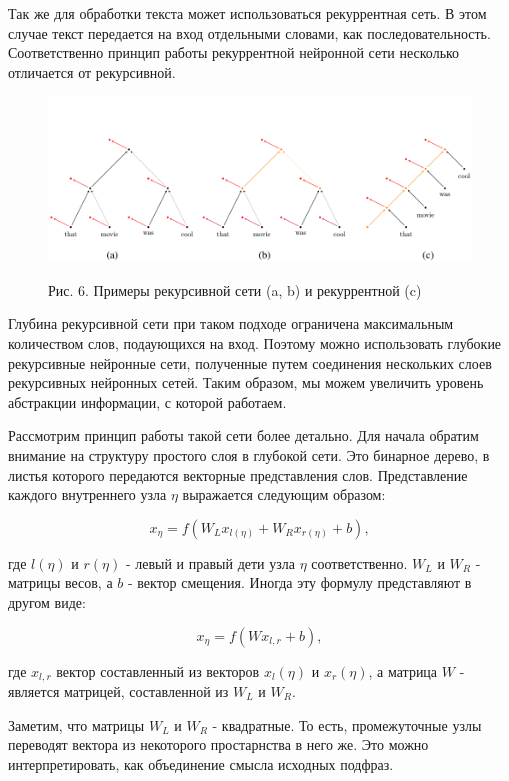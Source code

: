 \documentclass[14pt]{article}
\begin{document}
Так же для обработки текста может использоваться рекуррентная сеть. В этом случае текст передается на вход отдельными словами, как последовательность. Соответственно принцип работы рекуррентной нейронной сети несколько отличается от рекурсивной.
\pagebreak
\begin{figure}[!h]
    \centering
        \includegraphics[width=16cm]{Fig6.png}
    \parbox[t][1.2cm][c]{16cm}{
        \centering
        Рис. 6. Примеры рекурсивной сети (a, b) и рекуррентной (c)
    }
\end{figure}


Глубина рекурсивной сети при таком подходе ограничена максимальным количеством слов, подаующихся на вход. Поэтому можно использовать глубокие рекурсивные нейронные сети, полученные путем соединения нескольких слоев рекурсивных нейронных сетей. Таким образом, мы можем увеличить уровень абстракции информации, с которой работаем.


Рассмотрим принцип работы такой сети более детально. Для начала обратим внимание на структуру простого слоя в глубокой сети. Это бинарное дерево, в листья которого передаются векторные представления слов. Представление каждого внутреннего узла $\eta$ выражается следующим образом:


\begin{equation}
x_\eta=f(W_Lx_{l(\eta)} + W_Rx_{r(\eta)} + b),
\end{equation}


где $l(\eta)$ и $r(\eta)$ - левый и правый дети узла $\eta$ соответственно. $W_L$ и $W_R$ - матрицы весов, а $b$ - вектор смещения. Иногда эту формулу представляют в другом виде:


\begin{equation}
x_\eta=f(Wx_{l, r} + b),
\end{equation}

где $x_{l, r}$ вектор составленный из векторов $x_l(\eta)$ и $x_r(\eta)$, а матрица $W$ - является матрицей, составленной из $W_L$ и $W_R$.


Заметим, что матрицы $W_L$ и $W_R$ - квадратные. То есть, промежуточные узлы переводят вектора из некоторого простарнства в него же. Это можно интерпретировать, как объединение смысла исходных подфраз.
\end{document}
